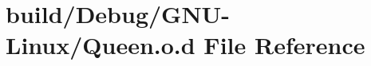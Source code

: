 \hypertarget{_g_n_u-_linux_2_queen_8o_8d}{}\section{build/\+Debug/\+G\+N\+U-\/\+Linux/\+Queen.o.\+d File Reference}
\label{_g_n_u-_linux_2_queen_8o_8d}
